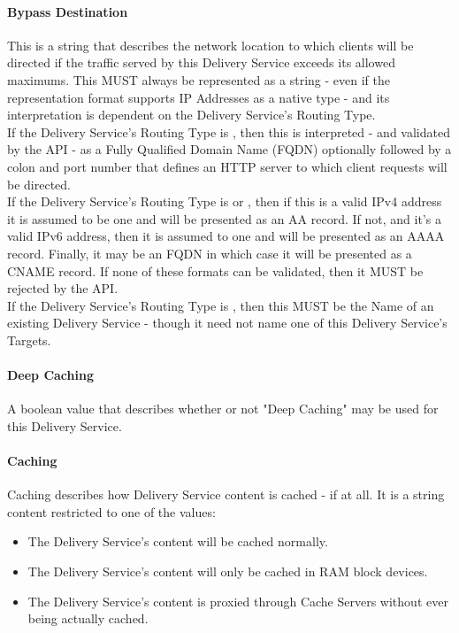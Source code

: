 \paragraph{Bypass Destination}
This is a string that describes the network location to which clients will be
directed if the traffic served by this Delivery Service exceeds its allowed
maximums. This MUST always be represented as a string - even if the
representation format supports IP Addresses as a native type - and its
interpretation is dependent on the Delivery Service's Routing Type.\\
If the Delivery Service's Routing Type is , then this is interpreted
- and validated by the API - as a Fully Qualified Domain Name (FQDN) optionally
followed by a colon and port number that defines an HTTP server to which client
requests will be directed.\\
If the Delivery Service's Routing Type is  or , then if
this is a valid IPv4 address it is assumed to be one and will be presented as an
AA record. If not, and it's a valid IPv6 address, then it is assumed to one and
will be presented as an AAAA record. Finally, it may be an FQDN in which case it
will be presented as a CNAME record. If none of these formats can be validated,
then it MUST be rejected by the API.\\
If the Delivery Service's Routing Type is , then this MUST be the
Name of an existing Delivery Service - though it need not name one of this
Delivery Service's Targets.

\paragraph{Deep Caching}
A boolean value that describes whether or not "Deep Caching" may be used for
this Delivery Service.

\paragraph{Caching}
Caching describes how Delivery Service content is cached - if at all. It is a
string content restricted to one of the values:

\begin{itemize}
	\item {} The Delivery Service's content will be cached normally.
	\item {} The Delivery Service's content will only be cached
	in RAM block devices.
	\item {} The Delivery Service's content is proxied through
	Cache Servers without ever being actually cached.
\end{itemize}

